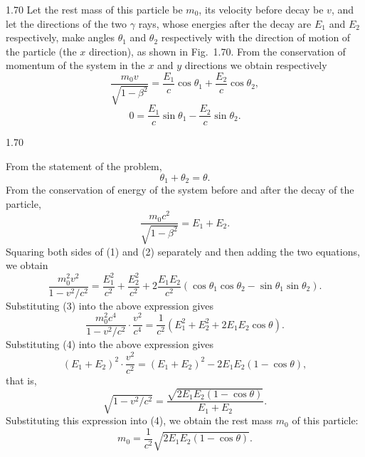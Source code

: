 \begin{solution}{1.70}
Let the rest mass of this particle be $m_0$, its velocity before decay be $v$, and let the directions of the two $\gamma$ rays, whose energies after the decay are $E_1$ and $E_2$ respectively, make angles $\theta_1$ and $\theta_2$ respectively with the direction of motion of the particle (the $x$ direction), as shown in Fig.~1.70. From the conservation of momentum of the system in the $x$ and $y$ directions we obtain respectively
\begin{equation}
\frac{m_0v}{\sqrt{1-\beta^2}}=\frac{E_1}{c}\cos\theta_1+\frac{E_2}{c}\cos\theta_2, \tag{1}
\end{equation}
\begin{equation}
0=\frac{E_1}{c}\sin\theta_1-\frac{E_2}{c}\sin\theta_2. \tag{2}
\end{equation}

\begin{figbox}{1.70}
\end{figbox}

From the statement of the problem,
\begin{equation}
\theta_1+\theta_2=\theta. \tag{3}
\end{equation}
From the conservation of energy of the system before and after the decay of the particle,
\begin{equation}
\frac{m_0c^2}{\sqrt{1-\beta^2}}=E_1+E_2. \tag{4}
\end{equation}
Squaring both sides of (1) and (2) separately and then adding the two equations, we obtain
\[
\frac{m_0^2v^2}{1-v^2/c^2}=\frac{E_1^2}{c^2}+\frac{E_2^2}{c^2}
+2\frac{E_1E_2}{c^2}\left(\cos\theta_1\cos\theta_2-\sin\theta_1\sin\theta_2\right).
\]
Substituting (3) into the above expression gives
\[
\frac{m_0^2c^4}{1-v^2/c^2}\cdot\frac{v^2}{c^4}
=\frac{1}{c^2}\left(E_1^2+E_2^2+2E_1E_2\cos\theta\right).
\]
Substituting (4) into the above expression gives
\[
(E_1+E_2)^2\cdot\frac{v^2}{c^2}=(E_1+E_2)^2-2E_1E_2(1-\cos\theta),
\]
that is,
\[
\sqrt{1-v^2/c^2}=\frac{\sqrt{2E_1E_2(1-\cos\theta)}}{E_1+E_2}.
\]
Substituting this expression into (4), we obtain the rest mass $m_0$ of this particle:
\[
m_0=\frac{1}{c^2}\sqrt{2E_1E_2(1-\cos\theta)}.
\]
\end{solution}

